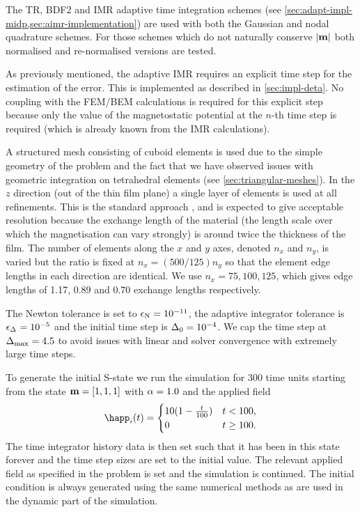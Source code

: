 The TR, BDF2 and IMR adaptive time integration schemes (see \cref{sec:adapt-impl-midp,sec:aimr-implementation}) are used with both the Gaussian and nodal quadrature schemes.
For those schemes which do not naturally conserve $\left|{\boldsymbol{\mathrm{m}}} \right|$ both normalised and re-normalised versions are tested.

As previously mentioned, the adaptive IMR requires an explicit time step for the estimation of the error.
This is implemented as described in \cref{sec:impl-deta}.
No coupling with the FEM/BEM calculations is required for this explicit step because only the value of the magnetostatic potential at the $n$-th time step is required (which is already known from the IMR calculations).

A structured mesh consisting of cuboid elements is used due to the simple geometry of the problem and the fact that we have observed issues with geometric integration on tetrahedral elements (see \cref{sec:triangular-meshes}).
In the $z$ direction (out of the thin film plane) a single layer of elements is used at all refinements.
This is the standard approach \cite{mumag-website}, and is expected to give acceptable resolution because the exchange length of the material (the length scale over which the magnetisation can vary strongly) is around twice the thickness of the film.
The number of elements along the $x$ and $y$ axes, denoted $n_x$ and $n_y$, is varied but the ratio is fixed at $n_x = (500/125) n_y$ so that the element edge lengths in each direction are identical.
We use $n_x=75,100,125$, which gives edge lengths of 1.17, 0.89 and 0.70 exchange lengths respectively.

The Newton tolerance is set to $\epsilon_{\mathrm{N}} = 10^{-11}$, the adaptive integrator tolerance is $\epsilon_{\Delta_{}} = 10^{-5}$ and the initial time step is $\Delta_{0} = 10^{-4}$.
We cap the time step at $\Delta_{\text{max}} = 4.5$ to avoid issues with linear and solver convergence with extremely large time steps.


To generate the initial S-state we run the simulation for 300 time units starting from the state $\boldsymbol{\mathrm{m}}=[1,1,1]$ with $\alpha = 1.0$ and the applied field
\begin{equation}
  \happ_i(t) =
  \begin{cases}
    10 (1- \frac{t}{100}) & t < 100, \\
    0 & t \geq 100.
  \end{cases}
\end{equation}
The time integrator history data is then set such that it has been in this state forever and the time step sizes are set to the initial value.
The relevant applied field as specified in the problem is set and the simulation is continued.
The initial condition is always generated using the same numerical methods as are used in the dynamic part of the simulation.

